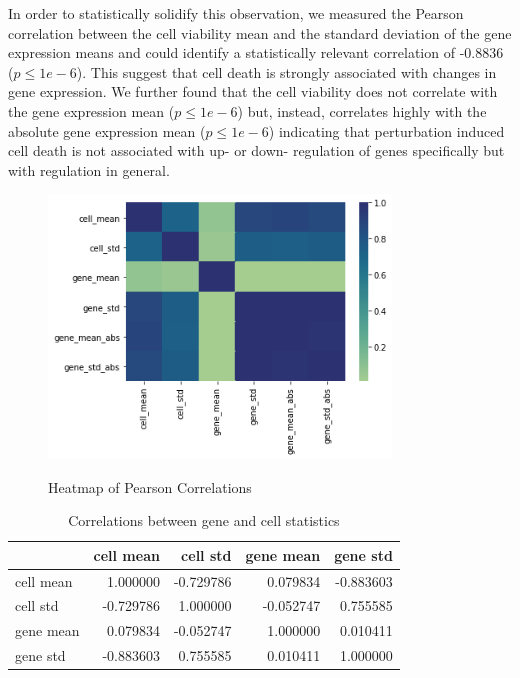 \documentclass[bsc,frontabs,twoside,singlespacing,parskip,deptreport]{infthesis}     %
\begin{document}
In order to statistically solidify this observation, we  measured the Pearson correlation between the cell viability mean and the standard deviation of the gene expression means and could identify a statistically relevant correlation of -0.8836 (\(p\leq1e-6\)). This suggest that cell death is strongly associated with changes in gene expression.
We further found that the cell viability does not correlate with the gene expression mean (\(p\leq1e-6\)) but, instead, correlates highly with the absolute gene expression mean (\(p\leq1e-6\)) indicating that perturbation induced cell death is not associated with up- or down- regulation of genes specifically but with regulation in general. 

\begin{figure}[h!]
\centering
\caption{Heatmap of Pearson Correlations}
\includegraphics[height=7cm]{images/gene_cell_corr.png}\label{corr_map}
\end{figure}
\begin{table}[h!]
\centering
\begin{tabular}{lrrrr}
\toprule
{} &  cell mean &  cell std &  gene mean &  gene std \\
\midrule
cell mean &   1.000000 & -0.729786 &   0.079834 & -0.883603 \\
cell std  &  -0.729786 &  1.000000 &  -0.052747 &  0.755585 \\
gene mean &   0.079834 & -0.052747 &   1.000000 &  0.010411 \\
gene std  &  -0.883603 &  0.755585 &   0.010411 &  1.000000 \\
\bottomrule
\end{tabular}
\caption{Correlations between gene and cell statistics}\label{cell_gene_corr_table}
\end{table}
\end{document}
